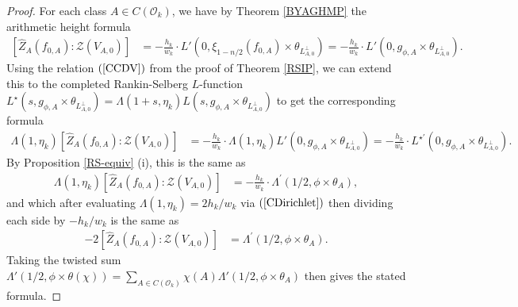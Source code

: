 \documentclass{amsart}
\theoremstyle{definition}
\theoremstyle{definition}
\theoremstyle{definition}
\begin{document}
\begin{proof} 

For each class $A \in C(\mathcal{O}_k)$, we have by Theorem \ref{BYAGHMP} the arithmetic height formula
\begin{align*} \left[ \widehat{Z}_A(f_{0, A}): \mathcal{Z}(V_{A, 0}) \right] 
&= - \frac{h_k}{w_k} \cdot L'(0, \xi_{1-n/2}(f_{0, A}) \times \theta_{L_{A,0}^{\perp}})  
= - \frac{h_k}{w_k} \cdot L'(0, g_{ \phi, A } \times \theta_{L_{A,0}^{\perp}}).\end{align*}
Using the relation $(\ref{CCDV})$ from the proof of Theorem \ref{RSIP}, we can extend this to the completed Rankin-Selberg $L$-function
$L^{\star}(s, g_{\phi, A} \times \theta_{ L_{A,0}^{\perp} }) = \Lambda(1+s, \eta_k) L(s, g_{\phi, A} \times \theta_{ L_{A,0}^{\perp}})$
to get the corresponding formula 
\begin{align*} \Lambda(1, \eta_k )\left[ \widehat{Z}_A(f_{0, A}): \mathcal{Z}(V_{A, 0}) \right] 
&= - \frac{h_k}{w_k} \cdot \Lambda(1, \eta_k) L'(0, g_{\phi, A} \times \theta_{L_{A,0}^{\perp}})  
= - \frac{h_k}{w_k} \cdot L^{\star \prime}(0, g_{ \phi, A } \times \theta_{L_{A,0}^{\perp}}).\end{align*}
By Proposition \ref{RS-equiv} (i), this is the same as 
\begin{align*} \Lambda(1, \eta_k )\left[ \widehat{Z}_A(f_{0, A}): \mathcal{Z}(V_{A, 0}) \right] 
&= - \frac{h_k}{w_k} \cdot \Lambda^{\prime}(1/2, \phi \times \theta_A),\end{align*}
and which after evaluating $\Lambda(1, \eta_k) = 2 h_k/w_k$ via $(\ref{CDirichlet})$ then dividing each side by $-h_k/w_k$ is the same as 
\begin{align*} -2 \left[ \widehat{Z}_A(f_{0, A}): \mathcal{Z}(V_{A, 0}) \right] &= \Lambda^{\prime}(1/2, \phi \times \theta_A). \end{align*}
Taking the twisted sum $\Lambda'(1/2, \phi \times \theta(\chi)) = \sum\limits_{A \in C(\mathcal{O}_k)} \chi(A) \Lambda'(1/2, \phi \times \theta_A)$
then gives the stated formula. \end{proof}
\end{document}

